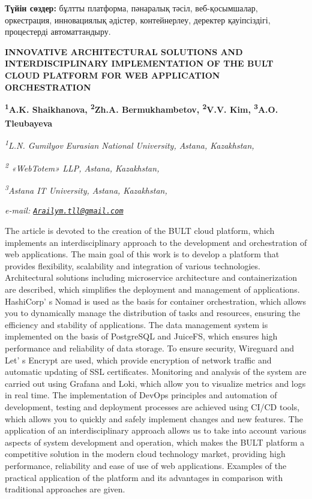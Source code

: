 {\bfseries Түйін сөздер:} бұлтты платформа, пәнаралық тәсіл,
веб-қосымшалар, оркестрация, инновациялық әдістер, контейнерлеу,
деректер қауіпсіздігі, процестерді автоматтандыру.

\begin{articleheader}
{\bfseries INNOVATIVE ARCHITECTURAL SOLUTIONS AND INTERDISCIPLINARY
IMPLEMENTATION OF THE BULT CLOUD PLATFORM FOR WEB APPLICATION
ORCHESTRATION}

{\bfseries
\textsuperscript{1}A.K. Shaikhanova,
\textsuperscript{2}Zh.A. Bermukhambetov,
\textsuperscript{2}V.V. Kim,
\textsuperscript{3}A.O. Tleubayeva\textsuperscript{\envelope }}
\end{articleheader}

\begin{affiliation}
\emph{\textsuperscript{1}L.N. Gumilyov Eurasian National University, Astana, Kazakhstan,}

\emph{\textsuperscript{2} «WebTotem» LLP, Astana, Kazakhstan,}

\emph{\textsuperscript{3}Astana IT University, Astana, Kazakhstan,}

\emph{e-mail: \href{mailto:Arailym.tll@gmail.com}{\nolinkurl{Arailym.tll@gmail.com}}}
\end{affiliation}

The article is devoted to the creation of the BULT cloud platform, which
implements an interdisciplinary approach to the development and
orchestration of web applications. The main goal of this work is to
develop a platform that provides flexibility, scalability and
integration of various technologies. Architectural solutions including
microservice architecture and containerization are described, which
simplifies the deployment and management of applications.
HashiCorp' s Nomad is used as the basis for container
orchestration, which allows you to dynamically manage the distribution
of tasks and resources, ensuring the efficiency and stability of
applications. The data management system is implemented on the basis of
PostgreSQL and JuiceFS, which ensures high performance and reliability
of data storage. To ensure security, Wireguard and Let' s
Encrypt are used, which provide encryption of network traffic and
automatic updating of SSL certificates. Monitoring and analysis of the
system are carried out using Grafana and Loki, which allow you to
visualize metrics and logs in real time. The implementation of DevOps
principles and automation of development, testing and deployment
processes are achieved using CI/CD tools, which allows you to quickly
and safely implement changes and new features. The application of an
interdisciplinary approach allows us to take into account various
aspects of system development and operation, which makes the BULT
platform a competitive solution in the modern cloud technology market,
providing high performance, reliability and ease of use of web
applications. Examples of the practical application of the platform and
its advantages in comparison with traditional approaches are given.

